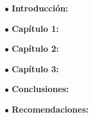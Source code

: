 %


%


%
%

\begin{itemize}
	\item[$\bullet$] \textbf{Introducción:}
	
	\item[$\bullet$] \textbf{Capítulo 1:} 
	
	\item[$\bullet$] \textbf{Capítulo 2:} 
	
	\item[$\bullet$] \textbf{Capítulo 3:} 
	
	\item[$\bullet$] \textbf{Conclusiones:} 
	
	\item[$\bullet$] \textbf{Recomendaciones:} 
	
	
\end{itemize}